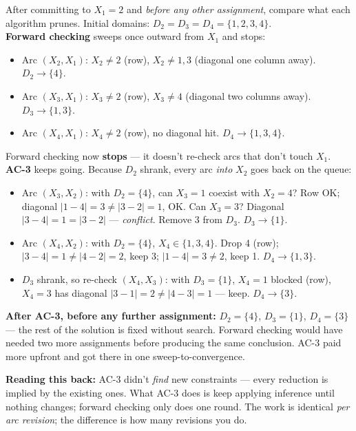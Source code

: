 \documentclass[11pt, a4paper]{article}
\begin{document}
\begin{exbox}[AC-3 vs forward checking on 4-queens after $X_1=2$]
After committing to $X_1 = 2$ and \emph{before any other assignment}, compare what each algorithm prunes. Initial domains: $D_2 = D_3 = D_4 = \{1, 2, 3, 4\}$.\\[0.3em]
\textbf{Forward checking} sweeps once outward from $X_1$ and stops:
\begin{itemize}[leftmargin=*, itemsep=0pt, topsep=0pt]
  \item Arc $(X_2, X_1)$: $X_2 \neq 2$ (row), $X_2 \neq 1, 3$ (diagonal one column away). $D_2 \to \{4\}$.
  \item Arc $(X_3, X_1)$: $X_3 \neq 2$ (row), $X_3 \neq 4$ (diagonal two columns away). $D_3 \to \{1, 3\}$.
  \item Arc $(X_4, X_1)$: $X_4 \neq 2$ (row), no diagonal hit. $D_4 \to \{1, 3, 4\}$.
\end{itemize}
Forward checking now \textbf{stops} — it doesn't re-check arcs that don't touch $X_1$.\\[0.3em]
\textbf{AC-3} keeps going. Because $D_2$ shrank, every arc \emph{into} $X_2$ goes back on the queue:
\begin{itemize}[leftmargin=*, itemsep=0pt, topsep=0pt]
  \item Arc $(X_3, X_2)$: with $D_2 = \{4\}$, can $X_3 = 1$ coexist with $X_2 = 4$? Row OK; diagonal $|1 - 4| = 3 \neq |3 - 2| = 1$, OK. Can $X_3 = 3$? Diagonal $|3 - 4| = 1 = |3 - 2|$ — \emph{conflict}. Remove 3 from $D_3$. $D_3 \to \{1\}$.
  \item Arc $(X_4, X_2)$: with $D_2 = \{4\}$, $X_4 \in \{1, 3, 4\}$. Drop 4 (row); $|3-4| = 1 \neq |4-2| = 2$, keep 3; $|1-4| = 3 \neq 2$, keep 1. $D_4 \to \{1, 3\}$.
  \item $D_3$ shrank, so re-check $(X_4, X_3)$: with $D_3 = \{1\}$, $X_4 = 1$ blocked (row), $X_4 = 3$ has diagonal $|3 - 1| = 2 \neq |4 - 3| = 1$ — keep. $D_4 \to \{3\}$.
\end{itemize}
\textbf{After AC-3, before any further assignment:} $D_2 = \{4\}$, $D_3 = \{1\}$, $D_4 = \{3\}$ — the rest of the solution is fixed without search. Forward checking would have needed two more assignments before producing the same conclusion. AC-3 paid more upfront and got there in one sweep-to-convergence.
\end{exbox}

\textbf{Reading this back:} AC-3 didn't \emph{find} new constraints — every reduction is implied by the existing ones. What AC-3 does is keep applying inference until nothing changes; forward checking only does one round. The work is identical \emph{per arc revision}; the difference is how many revisions you do.
\end{document}
